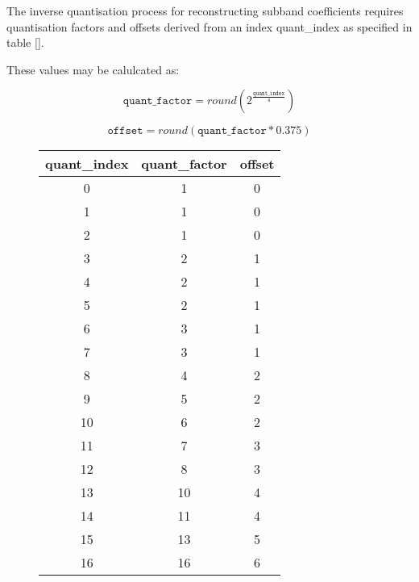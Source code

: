 
The inverse quantisation process for reconstructing subband coefficients
requires quantisation factors and offsets derived from an index
quant\_index as specified in table \ref{}.

These values may be calulcated as:

\begin{displaymath}
    \texttt{quant\_factor}= round(2^{\frac{\texttt{quant\_index}}{4}})
\end{displaymath}

\begin{displaymath}
    \texttt{offset}       = round(\texttt{quant\_factor} * 0.375)
\end{displaymath}
    

\begin{figure}[h!]
    \centering
    \begin{tabular}{|c|c|c|}
        \hline
        quant\_index & quant\_factor & offset \\\hline
        0            & 1             & 0      \\\hline
        1            & 1             & 0      \\\hline
        2            & 1             & 0      \\\hline
        3            & 2             & 1      \\\hline
        4            & 2             & 1      \\\hline
        5            & 2             & 1      \\\hline
        6            & 3             & 1      \\\hline
        7            & 3             & 1      \\\hline
        8            & 4             & 2      \\\hline
        9            & 5             & 2      \\\hline
        10           & 6             & 2      \\\hline
        11           & 7             & 3      \\\hline
        12           & 8             & 3      \\\hline
        13           & 10            & 4      \\\hline
        14           & 11            & 4      \\\hline
        15           & 13            & 5      \\\hline
        16           & 16            & 6      \\\hline

\end{tabular}
\end{figure}
